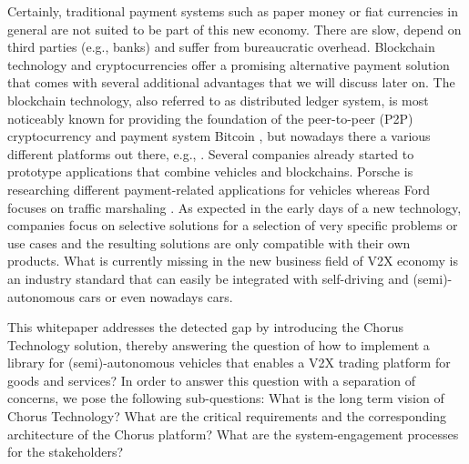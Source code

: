 \documentclass{llncs}
\begin{document}
{		Certainly, traditional payment systems such as paper money or fiat currencies in general are not suited to be part of this new economy. There are slow, depend on third parties (e.g., banks) and suffer from bureaucratic overhead. Blockchain technology and cryptocurrencies offer a promising alternative payment solution that comes with several additional advantages that we will discuss later on. The blockchain technology, also referred to as distributed ledger system, is most noticeably known for providing the foundation of the peer-to-peer (P2P) cryptocurrency and payment system Bitcoin \cite{nakamoto_bitcoin:2008}, but nowadays there a various different platforms out there, e.g., \cite{tezosWhitepaper}\cite{iotaWhitepaper}\cite{wood2014ethereum}. Several companies already started to prototype applications that combine vehicles and blockchains. Porsche is researching different payment-related applications for vehicles \cite{porscheBlockchain} whereas Ford focuses on traffic marshaling \cite{macneille2018vehicle}. As expected in the early days of a new technology, companies focus on selective solutions for a selection of very specific problems or use cases and the resulting solutions are only compatible with their own products. What is currently missing in the new business field of V2X economy is an industry standard that can easily be integrated with self-driving and (semi)-autonomous cars or even nowadays cars. 






		This whitepaper addresses the detected gap by introducing the Chorus Technology solution, thereby answering the question of how to implement a library for (semi)-autonomous vehicles that enables a V2X trading platform for goods and services? In order to answer this question with a separation of concerns, we pose the following sub-questions: What is the long term vision of Chorus Technology? What are the critical requirements and the corresponding architecture of the Chorus platform? What are the system-engagement processes for the stakeholders?

}
\end{document}
